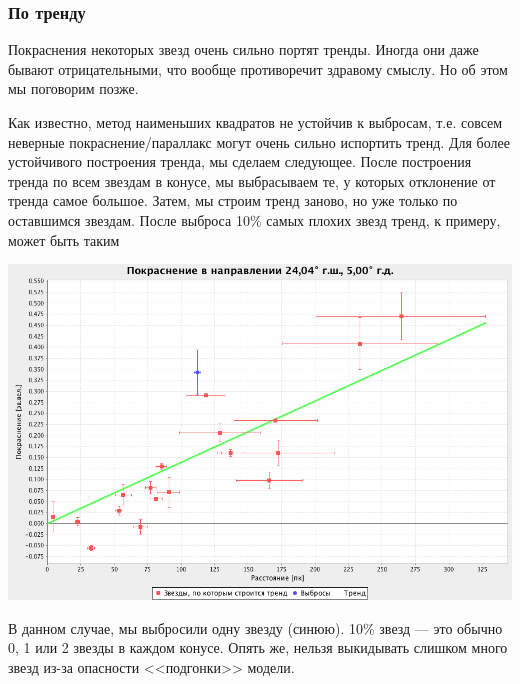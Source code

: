 \documentclass[14pt]{article}
\begin{document}
            \subsubsection{По тренду}
                Покраснения некоторых звезд очень сильно портят тренды. Иногда они даже бывают отрицательными, что вообще противоречит здравому смыслу. Но об этом мы поговорим позже.
                
                Как известно, метод наименьших квадратов не устойчив к выбросам, т.е. совсем неверные покраснение/параллакс могут очень сильно испортить тренд. Для более устойчивого построения тренда, мы сделаем следующее. После построения тренда по всем звездам в конусе, мы выбрасываем те, у которых отклонение от тренда самое большое. Затем, мы строим тренд заново, но уже только по оставшимся звездам. После выброса 10\% самых плохих звезд тренд, к примеру, может быть таким
                \begin{center}
					\includegraphics[scale=0.3]{../../presentation/real-2-k.png}
				\end{center}	
                
                В данном случае, мы выбросили одну звезду (синюю). 10\% звезд --- это обычно 0, 1 или 2 звезды в каждом конусе. Опять же, нельзя выкидывать слишком много звезд из-за опасности <<подгонки>> модели. 
		  	 
		  	 
\end{document}
